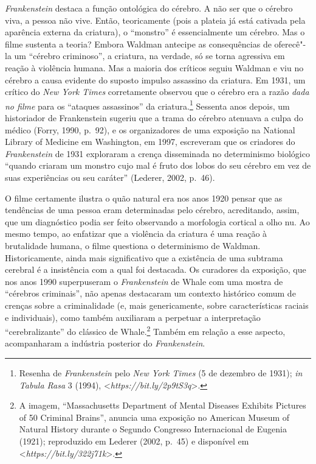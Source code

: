 \emph{Frankenstein} destaca a função ontológica do cérebro. A não ser
que o cérebro viva, a pessoa não vive. Então, teoricamente (pois a
plateia já está cativada pela aparência externa da criatura), o
``monstro'' é essencialmente um cérebro. Mas o filme sustenta a teoria?
Embora Waldman antecipe as consequências de oferecê"-la um ``cérebro
criminoso'', a criatura, na verdade, só se torna agressiva em reação à
violência humana. Mas a maioria dos críticos seguiu Waldman e viu no
cérebro a causa evidente do suposto impulso assassino da criatura. Em
1931, um crítico do \emph{New York Times} corretamente observou que o
cérebro era a razão \emph{dada no filme} para os ``ataques assassinos''
da criatura.\footnote[3]{Resenha de \emph{Frankenstein} pelo \emph{New York Times} (5 de
dezembro de 1931); \emph{in} \emph{Tabula Rasa} 3 (1994),
\textless{}\emph{https://bit.ly/2p9tS3q}\textgreater{}.} Sessenta anos depois, um historiador de
Frankenstein sugeriu que a trama do cérebro atenuava a culpa do médico
(Forry, 1990, p.~92), e os organizadores de uma exposição na National
Library of Medicine em Washington, em 1997, escreveram que os criadores
do \emph{Frankenstein} de 1931 exploraram a crença disseminada no
determinismo biológico ``quando criaram um monstro cujo mal é fruto dos
lobos do seu cérebro em vez de suas experiências ou seu caráter''
(Lederer, 2002, p.~46).

O filme certamente ilustra o quão natural era nos anos 1920 pensar que
as tendências de uma pessoa eram determinadas pelo cérebro, acreditando,
assim, que um diagnóstico podia ser feito observando a morfologia
cortical a olho nu. Ao mesmo tempo, ao enfatizar que a violência da
criatura é uma reação à brutalidade humana, o filme questiona o
determinismo de Waldman. Historicamente, ainda mais significativo que a
existência de uma subtrama cerebral é a insistência com a qual foi
destacada. Os curadores da exposição, que nos anos 1990 superpuseram o
\emph{Frankenstein} de Whale com uma mostra de ``cérebros criminais'',
não apenas destacaram um contexto histórico comum de crenças sobre a
criminalidade (e, mais genericamente, sobre características raciais e
individuais), como também auxiliaram a perpetuar a interpretação
``cerebralizante'' do clássico de Whale.\footnote[4]{A imagem, ``Massachusetts Department of Mental Diseases Exhibits
Pictures of 50 Criminal Brains'', anuncia uma exposição no American
Museum of Natural History durante o Segundo Congresso Internacional de
Eugenia (1921); reproduzido em Lederer (2002, p.~45) e disponível em
\textless{}\emph{https://bit.ly/322j71k}\textgreater{}.} Também em
relação a esse aspecto, acompanharam a indústria posterior do
\emph{Frankenstein}.

